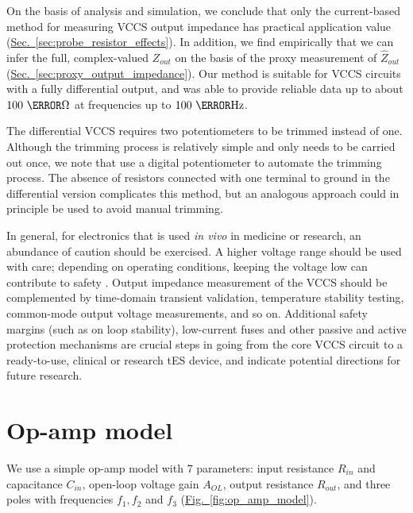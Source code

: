 \documentclass[10pt]{article}
\newcommand{\briefseclink}[1]{\hyperref[#1]{Sec.~\ref*{#1}}}
\newcommand{\brieffiglink}[1]{\hyperref[#1]{Fig.~\ref*{#1}}}
\begin{document}
On the basis of analysis and simulation, we conclude that only the current-based method for measuring VCCS output impedance has practical application value (\briefseclink{sec:probe_resistor_effects}). In addition, we find empirically that we can infer the full, complex-valued $Z_{out}$ on the basis of the proxy measurement of $\hat{Z}_{out}$ (\briefseclink{sec:proxy_output_impedance}). Our method is suitable for VCCS circuits with a fully differential output, and was able to provide reliable data up to about $100~\mega\ohm$ at frequencies up to $100~\kilo\hertz$.

The differential VCCS requires two potentiometers to be trimmed instead of one. Although the trimming process is relatively simple and only needs to be carried out once, we note that \cite{lee2003precision} use a digital potentiometer to automate the trimming process. The absence of resistors connected with one terminal to ground in the differential version complicates this method, but an analogous approach could in principle be used to avoid manual trimming.

In general, for electronics that is used \emph{in vivo} in medicine or research, an abundance of caution should be exercised. A higher voltage range should be used with care; depending on operating conditions, keeping the voltage low can contribute to safety \cite{pmid15661300}. Output impedance measurement of the VCCS should be complemented by time-domain transient validation, temperature stability testing, common-mode output voltage measurements, and so on. Additional safety margins (such as on loop stability), low-current fuses and other passive and active protection mechanisms are crucial steps in going from the core VCCS circuit to a ready-to-use, clinical or research tES device, and indicate potential directions for future research.


\appendix

\section{Op-amp model}
\label{sec:op_amp_model}

We use a simple op-amp model with 7 parameters: input resistance $R_{in}$ and capacitance $C_{in}$, open-loop voltage gain $A_{OL}$, output resistance $R_{out}$, and three poles with frequencies $f_1, f_2$ and $f_3$ (\brieffiglink{fig:op_amp_model}).
\end{document}
